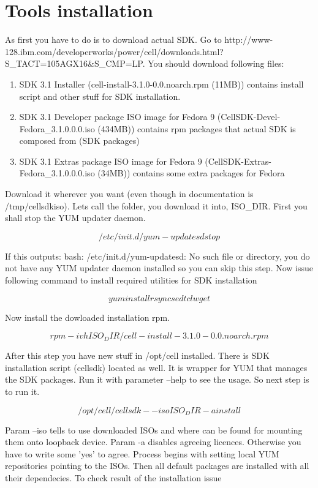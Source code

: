\chapter{Tools installation}
As first you have to do is to download actual SDK. Go to http://www-128.ibm.com/developerworks/power/cell/downloads.html?S_TACT=105AGX16&S_CMP=LP. You should download following files:

\begin{enumerate} 
\item SDK 3.1 Installer (cell-install-3.1.0-0.0.noarch.rpm  (11MB))
contains install script and other stuff for SDK installation.
\item SDK 3.1 Developer package ISO image for Fedora 9 (CellSDK-Devel-Fedora_3.1.0.0.0.iso  (434MB))
contains rpm packages that actual SDK is composed from (SDK packages) 
\item SDK 3.1 Extras package ISO image for Fedora 9 (CellSDK-Extras-Fedora_3.1.0.0.0.iso  (34MB))
contains some extra packages for Fedora
\end{enumerate}

Download it wherever you want (even though in documentation is /tmp/cellsdkiso). Lets call the folder, you download it into, ISO_DIR.  First you shall stop the YUM updater daemon.

$$
/etc/init.d/yum-updatesd stop
$$

If this outputs: bash: /etc/init.d/yum-updatesd: No such file or directory, you do not have any YUM updater daemon installed so you can skip this step. Now issue following command to install required utilities for SDK installation

$$
yum install rsync sed tcl wget
$$

Now install the dowloaded installation rpm.

$$
rpm -ivh ISO_DIR/cell-install-3.1.0-0.0.noarch.rpm
$$

After this step you have new stuff in /opt/cell installed. There is SDK installation script (cellsdk) located as well. It is wrapper for YUM that manages the SDK packages. Run it with parameter --help to see the usage. So next step is to run it. 

$$
/opt/cell/cellsdk --iso ISO_DIR -a install
$$

Param --iso tells to use downloaded ISOs and where can be found for mounting them onto loopback device. Param -a disables agreeing licences. Otherwise you have to write some 'yes' to agree. Process begins with setting local YUM repositories pointing to the ISOs. Then all default packages are installed with all their dependecies. To check result of the installation issue

